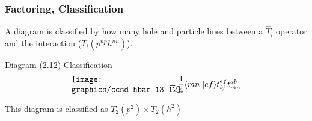 \begin{frame}
    \frametitle{Factoring, Classification}

A diagram is classified by how many hole and particle lines between a $\hat{T}_i$ operator and the interaction ($T_i(p^{np} h^{nh})$).
\begin{block}{Diagram (2.12) Classification}
    \begin{equation*}
        \parbox{40mm}{\texttt{[image: graphics/ccsd\_hbar\_13\_12]}}
        = \frac{1}{4}  \bra{mn}\ket{ef} t_{ij}^{ef} t_{mn}^{ab}
    \end{equation*}
\end{block}
This diagram is classified as $T_2(p^2) \times T_2(h^2)$
\end{frame}


